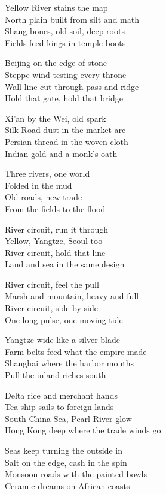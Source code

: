 \begin{lyrics}
Yellow River stains the map\\
North plain built from silt and math\\
Shang bones, old soil, deep roots\\
Fields feed kings in temple boots

Beijing on the edge of stone\\
Steppe wind testing every throne\\
Wall line cut through pass and ridge\\
Hold that gate, hold that bridge

Xi’an by the Wei, old spark\\
Silk Road dust in the market arc\\
Persian thread in the woven cloth\\
Indian gold and a monk’s oath

Three rivers, one world\\
Folded in the mud\\
Old roads, new trade\\
From the fields to the flood

River circuit, run it through\\
Yellow, Yangtze, Seoul too\\
River circuit, hold that line\\
Land and sea in the same design

River circuit, feel the pull\\
Marsh and mountain, heavy and full\\
River circuit, side by side\\
One long pulse, one moving tide

Yangtze wide like a silver blade\\
Farm belts feed what the empire made\\
Shanghai where the harbor mouths\\
Pull the inland riches south

Delta rice and merchant hands\\
Tea ship sails to foreign lands\\
South China Sea, Pearl River glow\\
Hong Kong deep where the trade winds go

Seas keep turning the outside in\\
Salt on the edge, cash in the spin\\
Monsoon roads with the painted bowls\\
Ceramic dreams on African coasts


\end{lyrics}
